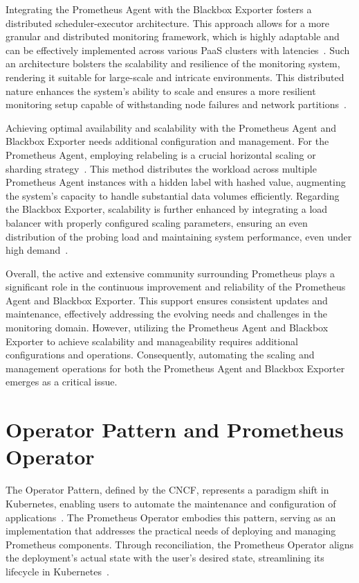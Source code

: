 Integrating the Prometheus Agent with the Blackbox Exporter fosters a distributed scheduler-executor architecture. This approach allows for a more granular and distributed monitoring framework, which is highly adaptable and can be effectively implemented across various \ac{PaaS} clusters with latencies~\parencite{prometheusUnderstandingUsingMultitarget}. Such an architecture bolsters the scalability and resilience of the monitoring system, rendering it suitable for large-scale and intricate environments. This distributed nature enhances the system's ability to scale and ensures a more resilient monitoring setup capable of withstanding node failures and network partitions~\parencite{prometheusIntroducingPrometheusAgent}.

Achieving optimal availability and scalability with the Prometheus Agent and Blackbox Exporter needs additional configuration and management. For the Prometheus Agent, employing relabeling is a crucial horizontal scaling or sharding strategy~\parencite{prometheusHowRelabelingPrometheus}. This method distributes the workload across multiple Prometheus Agent instances with a hidden label with hashed value, augmenting the system's capacity to handle substantial data volumes efficiently. Regarding the Blackbox Exporter, scalability is further enhanced by integrating a load balancer with properly configured scaling parameters, ensuring an even distribution of the probing load and maintaining system performance, even under high demand~\parencite{prometheusIntroducingPrometheusAgent}.

Overall, the active and extensive community surrounding Prometheus plays a significant role in the continuous improvement and reliability of the Prometheus Agent and Blackbox Exporter. This support ensures consistent updates and maintenance, effectively addressing the evolving needs and challenges in the monitoring domain. However, utilizing the Prometheus Agent and Blackbox Exporter to achieve scalability and manageability requires additional configurations and operations. Consequently, automating the scaling and management operations for both the Prometheus Agent and Blackbox Exporter emerges as a critical issue.

\section{Operator Pattern and Prometheus Operator}

The Operator Pattern, defined by the \ac{CNCF}, represents a paradigm shift in Kubernetes, enabling users to automate the maintenance and configuration of applications~\parencite{kubernetesOperatorPattern}. The Prometheus Operator embodies this pattern, serving as an implementation that addresses the practical needs of deploying and managing Prometheus components. Through reconciliation, the Prometheus Operator aligns the deployment's actual state with the user's desired state, streamlining its lifecycle in Kubernetes~\parencite{prometheusoperatorIntroduction2020}.

